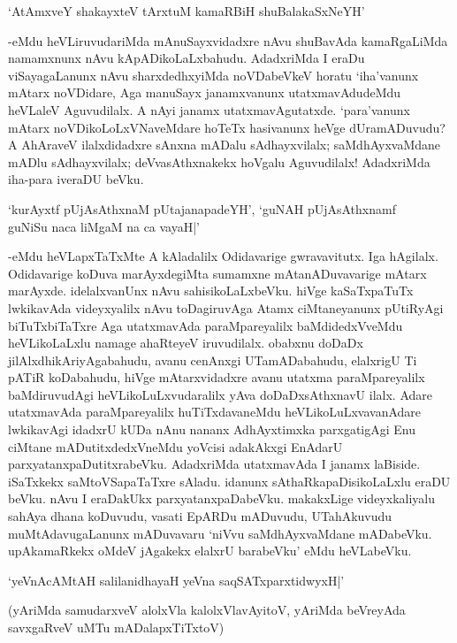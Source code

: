 \begin{shloka}
`AtAmxveY shakayxteV tArxtuM kamaRBiH shuBalakaSxNeYH'
\end{shloka}

-eMdu heVLiruvudariMda mAnuSayxvidadxre nAvu shuBavAda kamaRgaLiMda namamxnunx nAvu kApADikoLaLxbahudu. AdadxriMda I eraDu viSayagaLanunx nAvu sharxdedhxyiMda noVDabeVkeV horatu `iha'vanunx mAtarx noVDidare, Aga manuSayx janamxvanunx utatxmavAdudeMdu heVLaleV Aguvudilalx. A nAyi janamx utatxmavAgutatxde. `para'vanunx mAtarx noVDikoLoLxVNaveMdare hoTeTx hasivanunx heVge dUramADuvudu? A AhAraveV ilalxdidadxre sAnxna mADalu sAdhayxvilalx; saMdhAyxvaMdane mADlu sAdhayxvilalx; deVvasAthxnakekx hoVgalu Aguvudilalx! AdadxriMda iha-para iveraDU beVku.

\begin{shloka}
`kurAyxtf pUjAsAthxnaM pUtajanapadeYH', `guNAH pUjAsAthxnamf\\
guNiSu naca liMgaM na ca vayaH|'
\end{shloka} 

-eMdu heVLapxTaTxMte A kAladalilx Odidavarige gwravavitutx. Iga hAgilalx. Odidavarige koDuva marAyxdegiMta sumamxne mAtanADuvavarige mAtarx marAyxde. idelalxvanUnx nAvu sahisikoLaLxbeVku. hiVge kaSaTxpaTuTx lwkikavAda videyxyalilx nAvu toDagiruvAga Atamx ciMtaneyanunx pUtiRyAgi biTuTxbiTaTxre Aga utatxmavAda paraMpareyalilx baMdidedxVveMdu heVLikoLaLxlu namage ahaRteyeV iruvudilalx. obabxnu doDaDx jilAlxdhikAriyAgabahudu, avanu cenAnxgi UTamADabahudu, elalxrigU Ti pATiR koDabahudu, hiVge mAtarxvidadxre avanu utatxma paraMpareyalilx baMdiruvudAgi heVLikoLuLxvudaralilx yAva doDaDxsAthxnavU ilalx. Adare utatxmavAda paraMpareyalilx huTiTxdavaneMdu heVLikoLuLxvavanAdare lwkikavAgi idadxrU kUDa nAnu nananx AdhAyxtimxka parxgatigAgi Enu ciMtane mADutitxdedxVneMdu yoVcisi adakAkxgi EnAdarU parxyatanxpaDutitxrabeVku. AdadxriMda utatxmavAda I janamx laBiside. iSaTxkekx saMtoVSapaTaTxre sAladu. idanunx sAthaRkapaDisikoLaLxlu eraDU beVku. nAvu I eraDakUkx parxyatanxpaDabeVku. makakxLige videyxkaliyalu sahAya dhana koDuvudu, vasati EpARDu mADuvudu, U{{Ta}}hAkuvudu muMtAdavugaLanunx mADuvavaru `niVvu saMdhAyxvaMdane mADabeVku. upAkamaRkekx oMdeV jAgakekx elalxrU barabeVku' eMdu heVLabeVku.

\begin{shloka}
`yeVnAcAMtAH salilanidhayaH yeVna saqSATxparxtidwyxH|'
\end{shloka}

(yAriMda samudarxveV alolxVla kalolxVlavAyitoV, yAriMda beVreyAda savxgaRveV uMTu mADalapxTiTxtoV)

